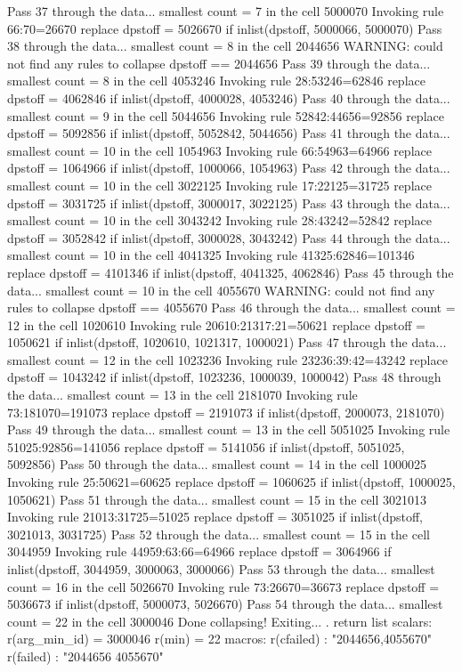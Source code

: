 Pass 37 through the data...
  smallest count = 7 in the cell      5000070
  Invoking rule 66:70=26670
  replace dpstoff = 5026670 if inlist(dpstoff, 5000066, 5000070)
Pass 38 through the data...
  smallest count = 8 in the cell      2044656
  WARNING: could not find any rules to collapse dpstoff == 2044656
Pass 39 through the data...
  smallest count = 8 in the cell      4053246
  Invoking rule 28:53246=62846
  replace dpstoff = 4062846 if inlist(dpstoff, 4000028, 4053246)
Pass 40 through the data...
  smallest count = 9 in the cell      5044656
  Invoking rule 52842:44656=92856
  replace dpstoff = 5092856 if inlist(dpstoff, 5052842, 5044656)
Pass 41 through the data...
  smallest count = 10 in the cell      1054963
  Invoking rule 66:54963=64966
  replace dpstoff = 1064966 if inlist(dpstoff, 1000066, 1054963)
Pass 42 through the data...
  smallest count = 10 in the cell      3022125
  Invoking rule 17:22125=31725
  replace dpstoff = 3031725 if inlist(dpstoff, 3000017, 3022125)
Pass 43 through the data...
  smallest count = 10 in the cell      3043242
  Invoking rule 28:43242=52842
  replace dpstoff = 3052842 if inlist(dpstoff, 3000028, 3043242)
Pass 44 through the data...
  smallest count = 10 in the cell      4041325
  Invoking rule 41325:62846=101346
  replace dpstoff = 4101346 if inlist(dpstoff, 4041325, 4062846)
Pass 45 through the data...
  smallest count = 10 in the cell      4055670
  WARNING: could not find any rules to collapse dpstoff == 4055670
Pass 46 through the data...
  smallest count = 12 in the cell      1020610
  Invoking rule 20610:21317:21=50621
  replace dpstoff = 1050621 if inlist(dpstoff, 1020610, 1021317, 1000021)
Pass 47 through the data...
  smallest count = 12 in the cell      1023236
  Invoking rule 23236:39:42=43242
  replace dpstoff = 1043242 if inlist(dpstoff, 1023236, 1000039, 1000042)
Pass 48 through the data...
  smallest count = 13 in the cell      2181070
  Invoking rule 73:181070=191073
  replace dpstoff = 2191073 if inlist(dpstoff, 2000073, 2181070)
Pass 49 through the data...
  smallest count = 13 in the cell      5051025
  Invoking rule 51025:92856=141056
  replace dpstoff = 5141056 if inlist(dpstoff, 5051025, 5092856)
Pass 50 through the data...
  smallest count = 14 in the cell      1000025
  Invoking rule 25:50621=60625
  replace dpstoff = 1060625 if inlist(dpstoff, 1000025, 1050621)
Pass 51 through the data...
  smallest count = 15 in the cell      3021013
  Invoking rule 21013:31725=51025
  replace dpstoff = 3051025 if inlist(dpstoff, 3021013, 3031725)
Pass 52 through the data...
  smallest count = 15 in the cell      3044959
  Invoking rule 44959:63:66=64966
  replace dpstoff = 3064966 if inlist(dpstoff, 3044959, 3000063, 3000066)
Pass 53 through the data...
  smallest count = 16 in the cell      5026670
  Invoking rule 73:26670=36673
  replace dpstoff = 5036673 if inlist(dpstoff, 5000073, 5026670)
Pass 54 through the data...
  smallest count = 22 in the cell      3000046
  Done collapsing! Exiting...
{\smallskip}
. return list
{\smallskip}
scalars:
         r(arg_min_id) =  3000046
                r(min) =  22
{\smallskip}
macros:
            r(cfailed) : "2044656,4055670"
             r(failed) : "2044656 4055670"
